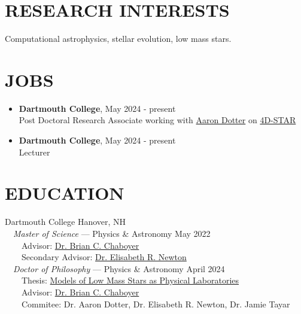 \documentclass[margin, 10pt]{res} %
\begin{document}
\begin{resume}

 
\section{RESEARCH INTERESTS}  
Computational astrophysics, stellar evolution, low mass stars.
 

\section{JOBS}
\begin{itemize}
  \item \textbf{{\scriptsize Dartmouth College}}, {\small May 2024 - present} \\Post Doctoral Research Associate working with \href{https://aarondotter.github.io/}{Aaron Dotter} on \href{https://fys.kuleuven.be/ster/research-projects/4d-star}{4D-STAR}
  \item \textbf{{\scriptsize Dartmouth College}}, {\small May 2024 - present} \\Lecturer
\end{itemize}

\section{EDUCATION}
{\large Dartmouth College} \hfill Hanover, NH\\
  {\-\ \-\ \small \textit{Master of Science} --- Physics \& Astronomy} \hfill May 2022\\
{\-\ \-\ \-\ \-\ \small Advisor: \href{https://physics.dartmouth.edu/people/brian-charles-chaboyer}{Dr. Brian C. Chaboyer}} \\
{\-\ \-\ \-\ \-\ \small Secondary Advisor: \href{https://physics.dartmouth.edu/people/elisabeth-newton}{Dr. Elisabeth R. Newton}} \\
  {\-\ \-\ \small \textit{Doctor of Philosophy} –-- Physics \& Astronomy} \hfill April 2024 \\
{\-\ \-\ \-\ \-\ \small Thesis: \href{https://raw.githubusercontent.com/tboudreaux/thesis/master/thesis/Thesis.pdf}{Models of Low Mass Stars as Physical Laboratories}} \\
{\-\ \-\ \-\ \-\ \small Advisor: \href{https://physics.dartmouth.edu/people/brian-charles-chaboyer}{Dr. Brian C. Chaboyer}} \\
{\-\ \-\ \-\ \-\ \small Commitee: Dr. Aaron Dotter, Dr. Elisabeth R. Newton, Dr. Jamie Tayar} \\


\end{resume}
\end{document}
